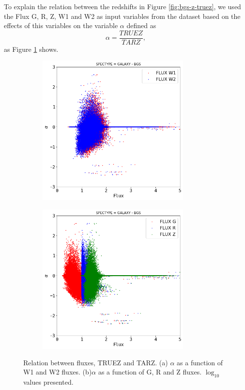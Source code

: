 \documentclass[]{article}
\begin{document}
To explain the relation between the redshifts in Figure \ref{fig:bgs-z-truez}, we used the Flux G, R, Z, W1 and W2 as input variables from the dataset based on the effects of this variables on the variable $\alpha$ defined as
\begin{equation}
	\alpha = \frac{TRUEZ}{TARZ},
\end{equation}
as Figure \ref{fig:BGS-FLUX-ALPHA} shows. 
\begin{figure}[!htp]
	\centering
	\begin{subfigure}[t]{0.5\textwidth}
		\centering
		\includegraphics[height=3in]{TeX_files/Imagenes/BGS-FLUXW-ALPHA}
		\caption{}
	\end{subfigure}%
	\begin{subfigure}[t]{0.5\textwidth}
		\centering
		\includegraphics[height=3in]{TeX_files/Imagenes/BGS-FLUXRGZ-ALPHA}
		\caption{}
	\end{subfigure}
	\caption{Relation between fluxes, TRUEZ and TARZ. (a) $\alpha$ as a function of W1 and W2 fluxes. (b)$\alpha$ as a function of G, R and Z fluxes. $\log_{10}$ values presented.}
	\label{fig:BGS-FLUX-ALPHA}
\end{figure} 
\end{document}
